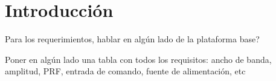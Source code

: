 \chapter{Introducción}

Para los requerimientos, hablar en algún lado de la plataforma base?

Poner en algún lado una tabla con todos los requisitos: ancho de banda, amplitud, PRF, entrada de comando, fuente de alimentación, etc
